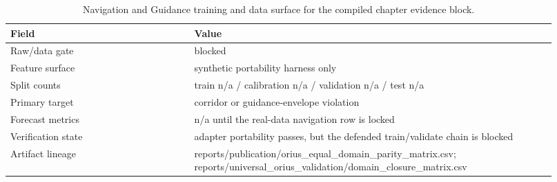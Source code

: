 \begin{table}[htbp]
\centering
\small
\caption{Navigation and Guidance training and data surface for the compiled chapter evidence block.}
\label{tab:navigation-training-surface}
\begin{tabular}{p{0.31\linewidth}p{0.61\linewidth}}
\toprule
\textbf{Field} & \textbf{Value}\\
\midrule
Raw/data gate & blocked\\
Feature surface & synthetic portability harness only\\
Split counts & train n/a / calibration n/a / validation n/a / test n/a\\
Primary target & corridor or guidance-envelope violation\\
Forecast metrics & n/a until the real-data navigation row is locked\\
Verification state & adapter portability passes, but the defended train/validate chain is blocked\\
Artifact lineage & reports/publication/orius\_equal\_domain\_parity\_matrix.csv; reports/universal\_orius\_validation/domain\_closure\_matrix.csv\\
\bottomrule
\end{tabular}
\end{table}
